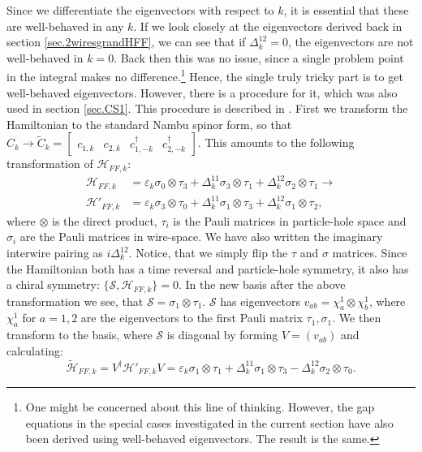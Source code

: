 Since we differentiate the eigenvectors with respect to $k$, it is essential that these are well-behaved in any $k$. If we look closely at the eigenvectors derived back in section \ref{sec.2wiresgrandHFF}, we can see that if $\Delta^{12}_k = 0$, the eigenvectors are not well-behaved in $k = 0$. Back then this was no issue, since a single problem point in the integral makes no difference.\footnote{One might be concerned about this line of thinking. However, the gap equations in the special cases investigated in the current section have also been derived using well-behaved eigenvectors. The result is the same.} Hence, the single truly tricky part is to get well-behaved eigenvectors. However, there is a procedure for it, which was also used in section \ref{sec.CS1}. This procedure is described in \cite{Ryu.Topology}. First we transform the Hamiltonian to the standard Nambu spinor form, so that $C_k \to \tilde{C}_k = \begin{bmatrix} c_{1,k} & c_{2,k} & c^\dagger_{1,-k} & c^\dagger_{2,-k}  \end{bmatrix}$. This amounts to the following transformation of $\mathcal{H}_{FF,k}$:
\begin{align}
\mathcal{H}_{FF,k} &= \varepsilon_k \sigma_0 \otimes \tau_3 + \Delta^{11}_k \sigma_3 \otimes \tau_1 + \Delta^{12}_k \sigma_2 \otimes \tau_1 \to \nonumber \\
\mathcal{H}'_{FF,k} &= \varepsilon_k \sigma_3 \otimes \tau_0 + \Delta^{11}_k \sigma_1 \otimes \tau_3 + \Delta^{12}_k \sigma_1 \otimes \tau_2, \nonumber 
\end{align}
where $\otimes$ is the direct product, $\tau_i$ is the Pauli matrices in particle-hole space and $\sigma_i$ are the Pauli matrices in wire-space. We have also written the imaginary interwire pairing as $i\Delta^{12}_k$. Notice, that we simply flip the $\tau$ and $\sigma$ matrices. Since the Hamiltonian both has a time reversal and particle-hole symmetry, it also has a chiral symmetry: $\{\mathcal{S}, \mathcal{H}_{FF,k}\} = 0$. In the new basis after the above transformation we see, that $\mathcal{S} = \sigma_1\otimes \tau_1$. $\mathcal{S}$ has eigenvectors $v_{ab} = \chi^{1}_a\otimes \chi^{1}_b$, where $\chi^{1}_a$ for $a = 1,2$ are the eigenvectors to the first Pauli matrix $\tau_1, \sigma_1$. We then transform to the basis, where $\mathcal{S}$ is diagonal by forming $V = (v_{ab})$ and calculating:
\begin{equation}
\tilde{\mathcal{H}}_{FF,k} = V^\dagger\mathcal{H}'_{FF,k}V = \varepsilon_k \sigma_1\otimes \tau_1 + \Delta^{11}_k \sigma_1\otimes\tau_3 - \Delta^{12}_k\sigma_2\otimes\tau_0. \nonumber 
\end{equation}
